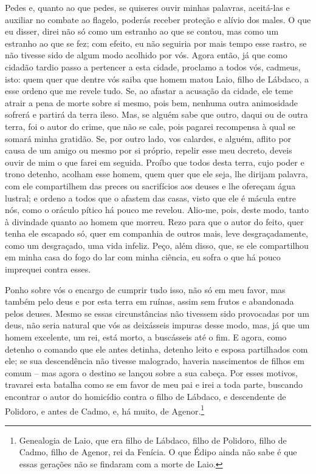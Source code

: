    Pedes e, quanto ao que pedes, se quiseres ouvir minhas palavras,
aceitá-las e auxiliar no combate ao flagelo, poderás receber proteção e
alívio dos males. O que eu disser, direi não só como um estranho ao que
se contou, mas como um estranho ao que se fez; com efeito, eu não
seguiria por mais tempo esse rastro, se não tivesse sido de algum modo
acolhido por vós. Agora então, já que como cidadão tardio passo a
pertencer a esta cidade, proclamo a todos vós, cadmeus, isto: quem quer
que dentre vós saiba que homem matou Laio, filho de Lábdaco, a esse
ordeno que me revele tudo. Se, ao afastar a acusação da cidade, ele teme
atrair a pena de morte sobre si mesmo, pois bem, nenhuma outra
animosidade sofrerá e partirá da terra ileso. Mas, se alguém sabe
que outro, daqui ou de outra terra, foi o autor do crime, que não se
cale, pois pagarei recompensa à qual se somará minha gratidão. Se, por
outro lado, vos calardes, e alguém, aflito por causa de um amigo ou
mesmo por si próprio, repelir esse meu decreto, deveis ouvir de mim o
que farei em seguida. Proíbo que todos desta terra, cujo poder e trono
detenho, acolham esse homem, quem quer que ele seja, lhe dirijam
palavra, com ele compartilhem das preces ou sacrifícios aos deuses e lhe
ofereçam água lustral; e ordeno a todos que o afastem das casas,
visto que ele é mácula entre nós, como o oráculo pítico há pouco me
revelou. Alio-me, pois, deste modo, tanto à divindade quanto ao homem
que morreu. Rezo para que o autor do feito, quer tenha ele escapado só,
quer em companhia de outros mais, leve desgraçadamente, como um
desgraçado, uma vida infeliz. Peço, além disso, que, se ele compartilhou
em minha casa do fogo do lar com minha ciência, eu sofra o que há
pouco imprequei contra esses.

Ponho sobre vós o encargo de cumprir tudo isso, não só em meu favor, mas
também pelo deus e por esta terra em ruínas, assim sem frutos e
abandonada pelos deuses. Mesmo se essas circunstâncias não tivessem sido
provocadas por um deus, não seria natural que vós as deixásseis impuras
desse modo, mas, já que um homem excelente, um rei, está morto, a
buscásseis até o fim. E agora, como detenho o comando que ele
antes detinha, detenho leito e esposa partilhados com ele; se sua
descendência não tivesse malogrado, haveria nascimentos de filhos em
comum -- mas agora o destino se lançou sobre a sua cabeça. Por esses
motivos, travarei esta batalha como se em favor de meu pai e irei a toda
parte, buscando encontrar o autor do homicídio contra o filho de
Lábdaco, e descendente de Polidoro, e antes de Cadmo, e, há muito, de
Agenor.\footnote{Genealogia de Laio, que era filho de Lábdaco, filho de
  Polidoro, filho de Cadmo, filho de Agenor, rei da Fenícia. O que Édipo
  ainda não sabe é que essas gerações não se findaram com a morte de
  Laio.}

